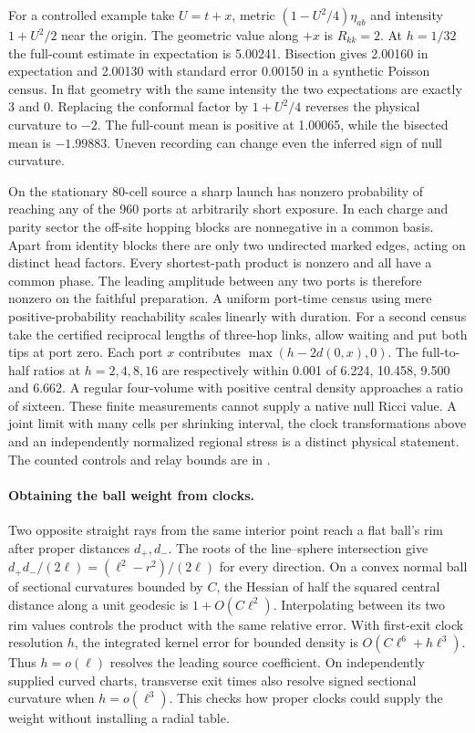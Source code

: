 \documentclass[11pt]{article}
\begin{document}
For a controlled example take \(U=t+x\), metric
\((1-U^2/4)\eta_{ab}\) and intensity \(1+U^2/2\) near the origin.
The geometric value along \(+x\) is \(R_{kk}=2\).
At \(h=1/32\) the full-count estimate in expectation is 5.00241.
Bisection gives 2.00160 in expectation and 2.00130 with standard
error 0.00150 in a synthetic Poisson census. In flat geometry with
the same intensity the two expectations are exactly 3 and 0.
Replacing the conformal factor by \(1+U^2/4\) reverses the physical
curvature to \(-2\). The full-count mean is positive at 1.00065,
while the bisected mean is \(-1.99883\).
Uneven recording can change even the inferred sign of null curvature.

On the stationary 80-cell source a sharp launch has nonzero probability
of reaching any of the 960 ports at arbitrarily short exposure.
In each charge and parity sector the off-site hopping blocks are
nonnegative in a common basis. Apart from identity blocks there are
only two undirected marked edges, acting on distinct head factors.
Every shortest-path product is nonzero and all have a common phase.
The leading amplitude between any two ports is therefore nonzero on
the faithful preparation. A uniform port-time census using mere
positive-probability reachability scales linearly with duration.
For a second census take the certified reciprocal lengths of
three-hop links, allow waiting and put both tips at port zero.
Each port \(x\) contributes \(\max(h-2d(0,x),0)\). The full-to-half
ratios at \(h=2,4,8,16\) are respectively within 0.001 of
6.224, 10.458, 9.500 and 6.662. A regular four-volume with positive
central density approaches a ratio of sixteen. These finite
measurements cannot supply a native null Ricci value. A joint limit
with many cells per shrinking interval, the clock transformations
above and an independently normalized regional stress is a distinct
physical statement. The counted controls and relay bounds are in
.

\paragraph{Obtaining the ball weight from clocks.}
Two opposite straight rays from the same interior point reach a flat
ball's rim after proper distances $d_+,d_-$. The roots of the
line--sphere intersection give
$d_+d_-/(2\ell)=(\ell^2-r^2)/(2\ell)$ for every direction. On a
convex normal ball of sectional curvatures bounded by $C$, the Hessian
of half the squared central distance along a unit geodesic is
$1+O(C\ell^2)$. Interpolating between its two rim values controls
the product with the same relative error. With first-exit clock
resolution $h$, the integrated kernel error for bounded density is
$O(C\ell^6+h\ell^3)$. Thus $h=o(\ell)$ resolves the leading source
coefficient. On independently supplied curved charts, transverse exit
times also resolve signed sectional curvature when $h=o(\ell^3)$.
This checks how proper clocks could supply the weight without
installing a radial table.
\end{document}

